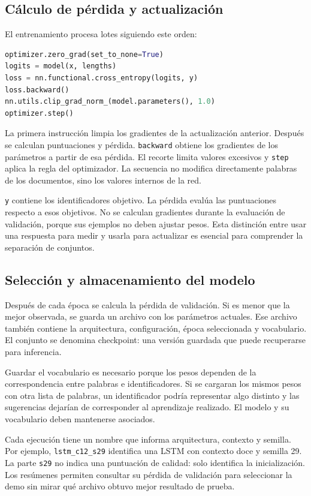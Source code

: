 \subsection{Cálculo de pérdida y actualización}
El entrenamiento procesa lotes siguiendo este orden:
\begin{lstlisting}[language=Python]
optimizer.zero_grad(set_to_none=True)
logits = model(x, lengths)
loss = nn.functional.cross_entropy(logits, y)
loss.backward()
nn.utils.clip_grad_norm_(model.parameters(), 1.0)
optimizer.step()
\end{lstlisting}
La primera instrucción limpia los gradientes de la actualización anterior. Después se calculan puntuaciones y pérdida. \texttt{backward} obtiene los gradientes de los parámetros a partir de esa pérdida. El recorte limita valores excesivos y \texttt{step} aplica la regla del optimizador. La secuencia no modifica directamente palabras de los documentos, sino los valores internos de la red.

\texttt{y} contiene los identificadores objetivo. La pérdida evalúa las puntuaciones respecto a esos objetivos. No se calculan gradientes durante la evaluación de validación, porque sus ejemplos no deben ajustar pesos. Esta distinción entre usar una respuesta para medir y usarla para actualizar es esencial para comprender la separación de conjuntos.

\subsection{Selección y almacenamiento del modelo}
Después de cada época se calcula la pérdida de validación. Si es menor que la mejor observada, se guarda un archivo con los parámetros actuales. Ese archivo también contiene la arquitectura, configuración, época seleccionada y vocabulario. El conjunto se denomina checkpoint: una versión guardada que puede recuperarse para inferencia.

Guardar el vocabulario es necesario porque los pesos dependen de la correspondencia entre palabras e identificadores. Si se cargaran los mismos pesos con otra lista de palabras, un identificador podría representar algo distinto y las sugerencias dejarían de corresponder al aprendizaje realizado. El modelo y su vocabulario deben mantenerse asociados.

Cada ejecución tiene un nombre que informa arquitectura, contexto y semilla. Por ejemplo, \texttt{lstm\_c12\_s29} identifica una LSTM con contexto doce y semilla 29. La parte \texttt{s29} no indica una puntuación de calidad: solo identifica la inicialización. Los resúmenes permiten consultar su pérdida de validación para seleccionar la demo sin mirar qué archivo obtuvo mejor resultado de prueba.

